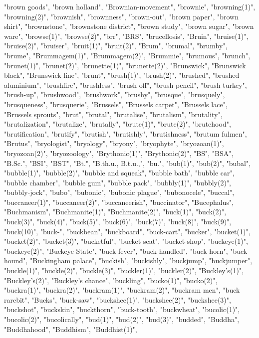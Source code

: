 "brown goods",
"brown holland",
"Brownian-movement",
"brownie",
"browning(1)",
"browning(2)",
"brownish",
"brownness",
"brown-out",
"brown paper",
"brown shirt",
"brownstone",
"brownstone district",
"brown study",
"brown sugar",
"brown ware",
"browse(1)",
"browse(2)",
"brr",
"BRS",
"brucellosis",
"Bruin",
"bruise(1)",
"bruise(2)",
"bruiser",
"bruit(1)",
"bruit(2)",
"Brum",
"brumal",
"brumby",
"brume",
"Brummagem(1)",
"Brummagem(2)",
"Brummie",
"brumous",
"brunch",
"brunet(1)",
"brunet(2)",
"brunette(1)",
"brunette(2)",
"Brunswick",
"Brunswick black",
"Brunswick line",
"brunt",
"brush(1)",
"brush(2)",
"brushed",
"brushed aluminium",
"brushfire",
"brushless",
"brush-off",
"brush-pencil",
"brush turkey",
"brush-up",
"brushwood",
"brushwork",
"brushy",
"brusque",
"brusquely",
"brusqueness",
"brusquerie",
"Brussels",
"Brussels carpet",
"Brussels lace",
"Brussels sprouts",
"brut",
"brutal",
"brutalise",
"brutalism",
"brutality",
"brutalization",
"brutalize",
"brutally",
"brute(1)",
"brute(2)",
"brutehood",
"brutification",
"brutify",
"brutish",
"brutishly",
"brutishness",
"brutum fulmen",
"Brutus",
"bryologist",
"bryology",
"bryony",
"bryophyte",
"bryozoan(1)",
"bryozoan(2)",
"bryozoology",
"Brythonic(1)",
"Brythonic(2)",
"BS",
"BSA",
"B.Sc.",
"BSI",
"BST",
"Bt.",
"B.th.u., B.t.u.,",
"bu.",
"bub(1)",
"bub(2)",
"bubal",
"bubble(1)",
"bubble(2)",
"bubble and squeak",
"bubble bath",
"bubble car",
"bubble chamber",
"bubble gum",
"bubble pack",
"bubbly(1)",
"bubbly(2)",
"bubbly-jock",
"bubo",
"bubonic",
"bubonic plague",
"bubonocele",
"buccal",
"buccaneer(1)",
"buccaneer(2)",
"buccaneerish",
"buccinator",
"Bucephalus",
"Buchmanism",
"Buchmanite(1)",
"Buchmanite(2)",
"buck(1)",
"buck(2)",
"buck(3)",
"buck(4)",
"buck(5)",
"buck(6)",
"buck(7)",
"buck(8)",
"buck(9)",
"buck(10)",
"buck-",
"buckbean",
"buckboard",
"buck-cart",
"bucker",
"bucket(1)",
"bucket(2)",
"bucket(3)",
"bucketful",
"bucket seat",
"bucket-shop",
"buckeye(1)",
"buckeye(2)",
"Buckeye State",
"buck fever",
"buck-handled",
"buck-horn",
"buck-hound",
"Buckingham palace",
"buckish",
"buckishly",
"buckjump",
"buckjumper",
"buckle(1)",
"buckle(2)",
"buckle(3)",
"buckler(1)",
"buckler(2)",
"Buckley's(1)",
"Buckley's(2)",
"Buckley's chance",
"buckling",
"bucko(1)",
"bucko(2)",
"buckra(1)",
"buckra(2)",
"buckram(1)",
"buckram(2)",
"buckram men",
"buck rarebit",
"Bucks",
"buck-saw",
"buckshee(1)",
"buckshee(2)",
"buckshee(3)",
"buckshot",
"buckskin",
"buckthorn",
"buck-tooth",
"buckwheat",
"bucolic(1)",
"bucolic(2)",
"bucolically",
"bud(1)",
"bud(2)",
"bud(3)",
"budded",
"Buddha",
"Buddhahood",
"Buddhism",
"Buddhist(1)",
